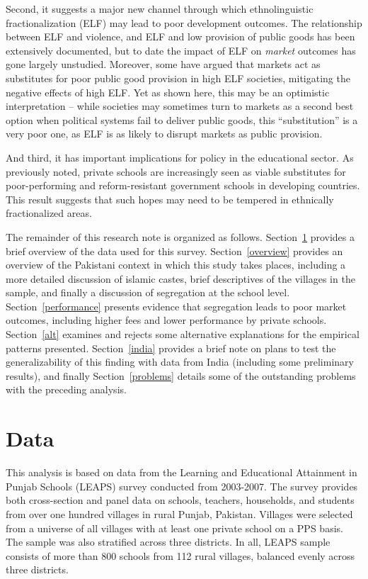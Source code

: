 \documentclass[12pt]{article}
\begin{document}
Second, it suggests a major new channel through which ethnolinguistic fractionalization (ELF) may lead to poor development outcomes. The relationship between ELF and violence, and ELF and low provision of public goods has been extensively documented, but to date the impact of ELF on \emph{market} outcomes has gone largely unstudied. Moreover, some have argued that markets act as substitutes for poor public good provision in high ELF societies, mitigating the negative effects of high ELF. Yet as shown here, this may be an optimistic interpretation -- while societies may sometimes turn to markets as a second best option when political systems fail to deliver public goods, this ``substitution'' is a very poor one, as ELF is as likely to disrupt markets as public provision. 

And third, it has important implications for policy in the educational sector. As previously noted, private schools are increasingly seen as viable substitutes for poor-performing and reform-resistant government schools in developing countries. This result suggests that such hopes may need to be tempered in ethnically fractionalized areas. 

The remainder of this research note is organized as follows. Section~\ref{data} provides a brief overview of the data used for this survey. Section~\ref{overview} provides an overview of the Pakistani context in which this study takes places, including a more detailed discussion of islamic castes, brief descriptives of the villages in the sample, and finally a discussion of segregation at the school level. Section~\ref{performance} presents evidence that segregation leads to poor market outcomes, including higher fees and lower performance by private schools. Section~\ref{alt} examines and rejects some alternative explanations for the empirical patterns presented. Section~\ref{india} provides a brief note on plans to test the generalizability of this finding with data from India (including some preliminary results), and finally Section~\ref{problems} details some of the outstanding problems with the preceding analysis. 


\section{Data}\label{data}

This analysis is based on data from the Learning and Educational Attainment in Punjab Schools (LEAPS) survey conducted from 2003-2007. The survey provides both cross-section and panel data on schools, teachers, households, and students from over one hundred villages in rural Punjab, Pakistan. Villages were selected from a universe of all villages with at least one private school on a PPS basis. The sample was also stratified across three districts. In all, LEAPS sample consists of more than 800 schools from 112 rural villages, balanced evenly across three districts. 
\end{document}
